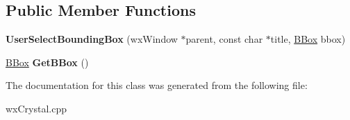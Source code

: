 \subsection*{Public Member Functions}
\begin{DoxyCompactItemize}
\item 
\mbox{\label{class_obj_cryst_1_1_user_select_bounding_box_a835acd7b8832d1d328ff7b73f099445d}} 
{\bfseries User\+Select\+Bounding\+Box} (wx\+Window $\ast$parent, const char $\ast$title, \mbox{\hyperlink{struct_obj_cryst_1_1_b_box}{B\+Box}} bbox)
\item 
\mbox{\label{class_obj_cryst_1_1_user_select_bounding_box_a0ccf60b76b394c6699cf3c3691bcc7f6}} 
\mbox{\hyperlink{struct_obj_cryst_1_1_b_box}{B\+Box}} {\bfseries Get\+B\+Box} ()
\end{DoxyCompactItemize}


The documentation for this class was generated from the following file\+:\begin{DoxyCompactItemize}
\item 
wx\+Crystal.\+cpp\end{DoxyCompactItemize}

